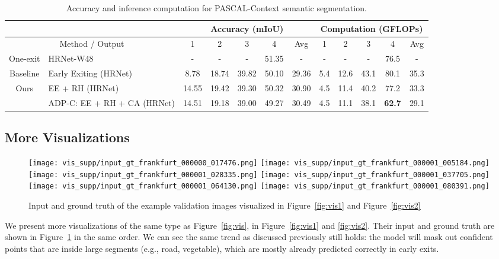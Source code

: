 \setlength{\tabcolsep}{2pt}
\renewcommand{\arraystretch}{1.2}
\begin{table}[!htbp]
\centering
\small
\begin{tabular}{c|l|ccccc|ccccc}
\hline
\multicolumn{2}{c|}{}                              & \multicolumn{5}{c}{Accuracy (mIoU)}         & \multicolumn{5}{|c}{Computation (GFLOPs)}            \\ \hline
\multicolumn{2}{c|}{Method / Output}               & 1    & 2    & 3    & 4    & Avg  & 1     & 2     & 3     & 4      & Avg   \\ \hline
 One-exit & HRNet-W48 \cite{wang2020deep}          & -    & -    & -    & 51.35 & -    & -     & -     & -     & 76.5  & -     \\ \hline
\multirow{1}{*}{Baseline} & Early Exiting (HRNet) & 8.78 & 18.74 & 39.82 & 50.10 & 29.36 & 5.4  &12.6 & 43.1 & 80.1  & 35.3 \\
                           \hline
\multirow{2}{*}{Ours}      
                           & EE + RH (HRNet)      & 14.55 & 19.42 & 39.30 & 50.32 & 30.90 & 4.5 & 11.4  & 40.2 & 77.2  & 33.3 \\
                           & ADP-C: EE + RH + CA (HRNet) & 14.51 & 19.18 & 39.00 & 49.27 & 30.49 & 4.5 & 11.1  & 38.1 & \textbf{62.7}  & 29.1 \\ \hline
\end{tabular}
\caption{%
Accuracy and inference computation for PASCAL-Context semantic segmentation. 
}
\label{tab:pascal}
\end{table}

\clearpage
\subsection{More Visualizations}
\label{app:vis}

\begin{figure}[!htbp]
\texttt{[image: vis\_supp/input\_gt\_frankfurt\_000000\_017476.png]}
\texttt{[image: vis\_supp/input\_gt\_frankfurt\_000001\_005184.png]}
\texttt{[image: vis\_supp/input\_gt\_frankfurt\_000001\_028335.png]}
\texttt{[image: vis\_supp/input\_gt\_frankfurt\_000001\_037705.png]}
\texttt{[image: vis\_supp/input\_gt\_frankfurt\_000001\_064130.png]}
\texttt{[image: vis\_supp/input\_gt\_frankfurt\_000001\_080391.png]}
\caption{Input and ground truth of the example validation images visualized in Figure~\ref{fig:vis1} and Figure~\ref{fig:vis2}}
\label{fig:gt}
\end{figure}
We present more visualizations of the same type as Figure~\ref{fig:vis}, in Figure~\ref{fig:vis1} and \ref{fig:vis2}. Their input and ground truth are shown in Figure~\ref{fig:gt} in the same order. We can see the same trend as discussed previously still holds: the model will mask out confident points that are inside large segments (e.g., road, vegetable), which are mostly already predicted correctly in early exits.

